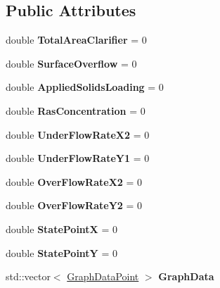 \subsection*{Public Attributes}
\begin{DoxyCompactItemize}
\item 
\mbox{\label{struct_sludge_volume_index_1_1_output_a174352cedb86f29569e5dd4b37b424dc}} 
double {\bfseries Total\+Area\+Clarifier} = 0
\item 
\mbox{\label{struct_sludge_volume_index_1_1_output_a30a9aee125768f35f13d09f07e5a1b0f}} 
double {\bfseries Surface\+Overflow} = 0
\item 
\mbox{\label{struct_sludge_volume_index_1_1_output_a19c54cf576ed55adff6231e0a6d4a91d}} 
double {\bfseries Applied\+Solids\+Loading} = 0
\item 
\mbox{\label{struct_sludge_volume_index_1_1_output_a8b850155376546ddd99bca0d056b42ee}} 
double {\bfseries Ras\+Concentration} = 0
\item 
\mbox{\label{struct_sludge_volume_index_1_1_output_a0e3cf80099a55e3defd879d3232bdeea}} 
double {\bfseries Under\+Flow\+Rate\+X2} = 0
\item 
\mbox{\label{struct_sludge_volume_index_1_1_output_a9eba6ce95356a107d91c5ceae53b85f2}} 
double {\bfseries Under\+Flow\+Rate\+Y1} = 0
\item 
\mbox{\label{struct_sludge_volume_index_1_1_output_a3b36b24f38dd23c0a25da35e362f74e8}} 
double {\bfseries Over\+Flow\+Rate\+X2} = 0
\item 
\mbox{\label{struct_sludge_volume_index_1_1_output_ab89d1e9b65ed6cdbf19570c49faedd92}} 
double {\bfseries Over\+Flow\+Rate\+Y2} = 0
\item 
\mbox{\label{struct_sludge_volume_index_1_1_output_a6c6c9f3ec22be523a1820e0fff68fdf6}} 
double {\bfseries State\+PointX} = 0
\item 
\mbox{\label{struct_sludge_volume_index_1_1_output_adcc10d3dc2dbcf23eee9d78c42c5ee01}} 
double {\bfseries State\+PointY} = 0
\item 
\mbox{\label{struct_sludge_volume_index_1_1_output_a2e6c3436c97ddbcb82f0ca1f74affbca}} 
std\+::vector$<$ \hyperlink{struct_sludge_volume_index_1_1_graph_data_point}{Graph\+Data\+Point} $>$ {\bfseries Graph\+Data}
\end{DoxyCompactItemize}


